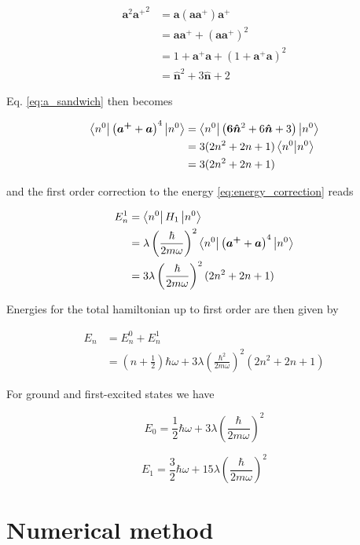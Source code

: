 \documentclass{article}
\begin{document}
\begin{align}
\bm{a}^2 {\bm{a^+}}^2 & = \bm{a} (\bm{a} \bm{a^+}) \bm{a^+} \nonumber \\
& = \bm{a} \bm{a^+} + (\bm{a} \bm{a^+})^2 \nonumber \\
& = 1 + \bm{a^+} \bm{a} + (1 + \bm{a^+} \bm{a})^2 \nonumber \\
& = \bm{ \hat{n} }^2 + 3 \bm{ \hat{n} } + 2
\end{align}

Eq. \eqref{eq:a_sandwich} then becomes


\begin{align}
\bra{n^0} \left( \bm{a^+} + \bm{a} \right)^4 \ket{n^0} & = \bra{n^0} \left( \bm{ 6 \hat{n} }^2 + 6 \bm{ \hat{n} } + 3 \right) \ket{n^0} \nonumber \\
& = 3 (2n^2 + 2n +1) \braket{n^0}{n^0} \nonumber \\
& = 3(2n^2 + 2n +1)
\end{align}

and the first order correction to the energy \eqref{eq:energy_correction} reads

\begin{align}
E_n^1 & = \bra{n^0} H_1 \ket{n^0} \nonumber \\
& = \lambda \left( \frac{\hbar}{2m \omega} \right)^2 \bra{n^0} \left( \bm{a^+} + \bm{a} \right)^4 \ket{n^0} \nonumber \\
& = 3 \lambda \left( \frac{\hbar}{2m \omega} \right)^2 (2n^2 + 2n +1)
\end{align}

Energies for the total hamiltonian up to first order are then given by

\begin{align}
E_n & = E_n^0 + E_n^1 \nonumber \\
& = \left( n + \frac{1}{2} \right) \hbar \omega + 3 \lambda \left( \frac{\hbar^2}{2m\omega} \right)^2 (2n^2 + 2n +1)
\end{align}

For ground and first-excited states we have

\begin{equation}
E_0 = \frac{1}{2} \hbar \omega + 3 \lambda \left( \frac{\hbar}{2m\omega} \right)^2
\end{equation}

\begin{equation}
E_1 = \frac{3}{2} \hbar \omega + 15 \lambda \left( \frac{\hbar}{2m\omega} \right)^2
\end{equation}

\section{Numerical method}
\end{document}
